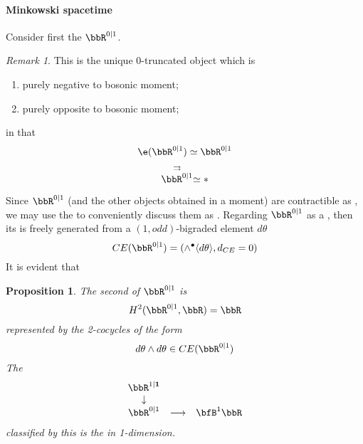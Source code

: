 \documentclass[12pt,titlepage]{article}
\newcommand{\itexarray}[1]{\begin{matrix}#1\end{matrix}}
\theoremstyle{plain}
\newtheorem{prop}{Proposition}
\theoremstyle{definition}
\theoremstyle{remark}
\newtheorem{remark}{Remark}
\begin{document}
\hypertarget{minkowski_spacetime}{}\paragraph*{{Minkowski spacetime}}\label{minkowski_spacetime}
Consider first the  $\bbR^{0|1}$.
\begin{remark}
\label{}\hypertarget{}{}
This is the unique 0-truncated object which is
\begin{enumerate}%
\item purely negative to bosonic moment;
\item purely opposite to bosonic moment;
\end{enumerate}
in that
\begin{displaymath}
\e(\bbR^{0|1})\simeq \bbR^{0|1}
\end{displaymath}
\begin{displaymath}
\stackrel{\rightrightarrows}{\bbR^{0|1}} \simeq \ast
\end{displaymath}
\end{remark}
Since $\bbR^{0|1}$ (and the other objects obtained in a moment) are contractible as , we may use the  to conveniently discuss them as . Regarding $\bbR^{0\vert 1}$ as a , then its  is freely generated from a $(1,odd)$-bigraded element $d\theta$
\begin{displaymath}
CE(\bbR^{0\vert 1})
=
\left(
\wedge^\bullet \langle d\theta \rangle, d_{CE} = 0
\right)
\end{displaymath}
It is evident that
\begin{prop}
\label{1dsuperMinkowskiFromInvariantExtension}\hypertarget{1dsuperMinkowskiFromInvariantExtension}{}
The second   of $\bbR^{0\vert 1}$ is
\begin{displaymath}
H^{2}(\bbR^{0\vert 1}, \bbR)
=
\bbR
\end{displaymath}
represented by the 2-cocycles of the form
\begin{displaymath}
d\theta\wedge d\theta
\in CE(\bbR^{0\vert 1})
\end{displaymath}
The 
\begin{displaymath}
\itexarray{
\bbR^{1|\mathbf{1}}
\\
\downarrow
\\
\bbR^{0|1}
&\stackrel{}{\longrightarrow}&
\bfB^1 \bbR
}
\end{displaymath}
classified by this is the  in 1-dimension.
\end{prop}
\end{document}
